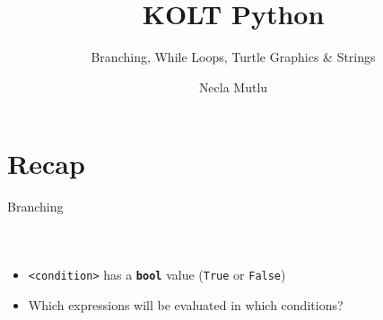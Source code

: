 

\usepackage{../KU-Beamer-Template/style/koc} 
\usepackage{minted}
\usepackage{upquote}
\usepackage{graphicx}

\title{KOLT Python} 
\subtitle{Branching, While Loops, Turtle Graphics \& Strings} 
\date{}
\author{Necla Mutlu}





    \maketitle


    \section{Recap}

        \begin{frame}{Branching}
            \vspace{-3mm}
            \begin{columns}
                \inputminted[firstline=1, lastline=4, frame=single,framesep=2pt]{python3}{code-examples/branching.py}
                \inputminted[firstline=6, lastline=13, frame=single,framesep=2pt]{python3}{code-examples/branching.py}
                \inputminted[firstline=15, lastline=27, frame=single,framesep=2pt]{python3}{code-examples/branching.py}
            \end{columns}
            \begin{itemize}
                \item \texttt{<condition>} has a \textbf{\texttt{bool}} value (\texttt{True} or \texttt{False})
                \item Which expressions will be evaluated in which conditions?
            \end{itemize}
        \end{frame}

